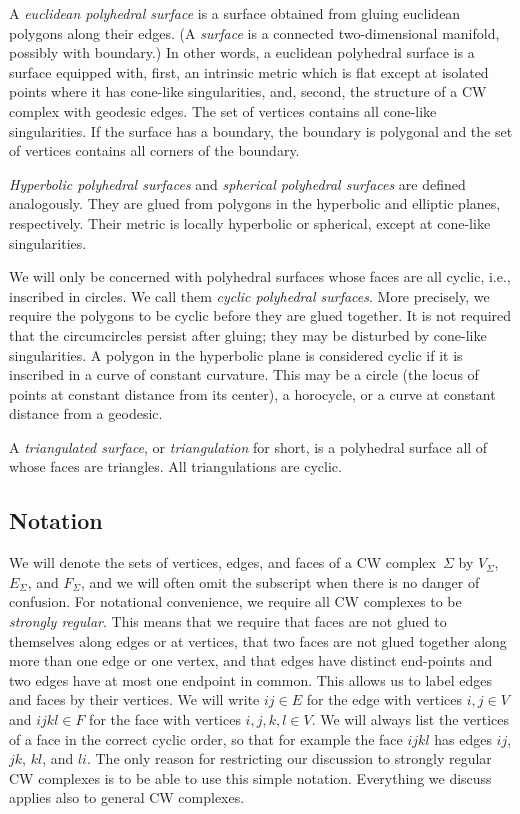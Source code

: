 \documentclass[Thesis]{subfiles}
\begin{document}
A \emph{euclidean polyhedral surface} is a surface obtained from
gluing euclidean polygons along their edges. (A \emph{surface} is a
connected two-dimensional manifold, possibly with boundary.)  In other
words, a euclidean polyhedral surface is a surface equipped with,
first, an intrinsic metric which is flat except at isolated points
where it has cone-like singularities, and, second, the structure of a
CW complex with geodesic edges. The set of vertices contains all
cone-like singularities. If the surface has a boundary, the boundary
is polygonal and the set of vertices contains all corners of the
boundary.

\emph{Hyperbolic polyhedral surfaces} and \emph{spherical polyhedral
surfaces} are defined analogously. They are glued from polygons in
the hyperbolic and elliptic planes, respectively. Their metric is
locally hyperbolic or spherical, except at cone-like singularities.

We will only be concerned with polyhedral surfaces whose faces are all
cyclic, i.e., inscribed in circles. We call them \emph{cyclic
polyhedral surfaces}. More precisely, we require the polygons to be
cyclic before they are glued together. It is not required that the
circumcircles persist after gluing; they may be disturbed by cone-like
singularities. A polygon in the hyperbolic plane is considered cyclic
if it is inscribed in a curve of constant curvature. This may be a
circle (the locus of points at constant distance from its center), a
horocycle, or a curve at constant distance from a geodesic.

A \emph{triangulated surface}, or \emph{triangulation} for short, is a
polyhedral surface all of whose faces are triangles.  All
triangulations are cyclic.

\subsection{Notation}
\label{sec:notation}

We will denote the sets of vertices, edges, and faces of a CW complex~$\Sigma$ by $V_{\Sigma}$, $E_{\Sigma}$, and $F_{\Sigma}$, and we will often omit the subscript when there is no danger of confusion.
For notational convenience, we require all CW complexes to be \emph{strongly regular}. 
This means that we require that faces are not glued to themselves along edges or at vertices, that two faces are not glued together along more than one edge or one vertex, and that edges have distinct end-points and two edges have at most one endpoint in common. 
This allows us to label edges and faces by their vertices. 
We will write $\mathit{ij}\in E$ for the edge with vertices $i,j\in V$ and $\mathit{ijkl}\in F$ for the face with vertices $i,j,k,l\in V$. 
We will always list the vertices of a face in the correct cyclic order, so that for example the face $\mathit{ijkl}$ has edges $\mathit{ij}$, $\mathit{jk}$, $\mathit{kl}$, and $\mathit{li}$.
The only reason for restricting our discussion to strongly regular CW complexes is to be able to use this simple notation. 
Everything we discuss applies also to general CW complexes.
\end{document}

